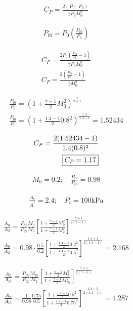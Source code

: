 \begin{align*}
    C_P=\frac{2(P-P_0)}{\gamma P_0M_0^2}
\end{align*}

\begin{align*}
    P_{t0}=P_0\left(\frac{P_{t0}}{P_0}\right)
\end{align*}

\begin{align*}
    C_P=\frac{2P_0\left(\frac{P_{t0}}{P_0}-1\right)}{\gamma P_0M_0^2} \\
    C_P=\frac{2\left(\frac{P_{t0}}{P_0}-1\right)}{\gamma M_0^2}
\end{align*}

\begin{align*}
    \frac{P_{t0}}{P_0}=\left(1+\frac{\gamma-1}{2}M_0^2\right)^{\frac{\gamma}{\gamma-1}} \\
    \frac{P_{t0}}{P_0}=\left(1+\frac{1.4-1}{2}0.8^2\right)^{\frac{1.4}{1.4-1}}=1.52434
\end{align*}

\begin{align*}
    C_P=\frac{2(1.52434-1)}{1.4(0.8)^2} \\
    \fbox{$C_P=1.17$}
\end{align*}


\begin{align*}
    M_0=0.2;\quad \frac{P_{t2}}{P_{t0}}=0.98
\end{align*}


\begin{align*}
    \frac{A_e}{A^*}=2.4;\quad P_t=100\text{kPa}
\end{align*}


\begin{align*}
    \frac{A_0}{A_2}=\frac{P_{t2}}{P_{t0}}\frac{M_2}{M_0}\left[
        \frac{1 + \frac{\gamma-1}{2}M_0^2}{1 + \frac{\gamma-1}{2}M_2^2}
    \right]^{\frac{\gamma+1}{2(\gamma-1)}} \\
    \frac{A_0}{A_2}=0.98\cdot \frac{0.5}{0.2}\left[
        \frac{1 + \frac{1.4-1}{2}0.2^2}{1 + \frac{1.4-1}{2}0.5^2}
    \right]^{\frac{1.4+1}{2(1.4-1)}}=2.168
\end{align*}


\begin{align*}
    \frac{A_2}{A_{th}}=\frac{P_{th}}{P_{t2}}\frac{M_{th}}{M_2}\left[
        \frac{1 + \frac{\gamma-1}{2}M_2^2}{1 + \frac{\gamma-1}{2}M_{th}^2}
    \right]^{\frac{\gamma+1}{2(\gamma-1)}} \\
    \frac{A_2}{A_{th}}=\frac{1}{0.98}\frac{0.75}{0.5}\left[
        \frac{1 + \frac{1.4-1}{2}0.5^2}{1 + \frac{1.4-1}{2}0.75^2}
    \right]^{\frac{1.4+1}{2(1.4-1)}}=1.287
\end{align*}



